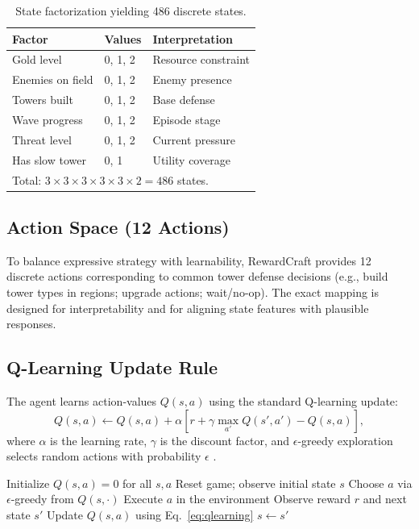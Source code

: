 \documentclass[conference]{IEEEtran}
\begin{document}
\begin{table}[t]
\caption{State factorization yielding 486 discrete states.}
\label{tab:state}
\centering
\begin{tabular}{@{}lll@{}}
\toprule
\textbf{Factor} & \textbf{Values} & \textbf{Interpretation} \\
\midrule
Gold level & 0, 1, 2 & Resource constraint \\
Enemies on field & 0, 1, 2 & Enemy presence \\
Towers built & 0, 1, 2 & Base defense \\
Wave progress & 0, 1, 2 & Episode stage \\
Threat level & 0, 1, 2 & Current pressure \\
Has slow tower & 0, 1 & Utility coverage \\
\midrule
\multicolumn{3}{l}{Total: $3 \times 3 \times 3 \times 3 \times 3 \times 2 = 486$ states.} \\
\bottomrule
\end{tabular}
\end{table}

\subsection{Action Space (12 Actions)}
To balance expressive strategy with learnability, RewardCraft provides 12 discrete actions corresponding to common tower defense decisions (e.g., build tower types in regions; upgrade actions; wait/no-op). The exact mapping is designed for interpretability and for aligning state features with plausible responses.

\subsection{Q-Learning Update Rule}
The agent learns action-values $Q(s,a)$ using the standard Q-learning update:
\begin{equation}
Q(s,a) \leftarrow Q(s,a) + \alpha \left[r + \gamma \max_{a'} Q(s',a') - Q(s,a)\right],
\label{eq:qlearning}
\end{equation}
where $\alpha$ is the learning rate, $\gamma$ is the discount factor, and $\epsilon$-greedy exploration selects random actions with probability $\epsilon$ \cite{watkins1992,sutton2018}.

\begin{algorithm}[t]
\caption{RewardCraft training loop (tabular Q-learning)}
\label{alg:qlearning}
\begin{algorithmic}[1]
\State Initialize $Q(s,a)=0$ for all $s,a$
  \State Reset game; observe initial state $s$
    \State Choose $a$ via $\epsilon$-greedy from $Q(s,\cdot)$
    \State Execute $a$ in the environment
    \State Observe reward $r$ and next state $s'$
    \State Update $Q(s,a)$ using Eq.~\ref{eq:qlearning}
    \State $s \leftarrow s'$
  \EndWhile
\EndFor
\end{algorithmic}
\end{algorithm}
\end{document}
